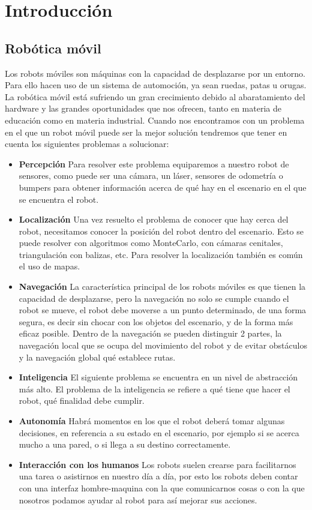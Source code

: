 \chapter{Introducción}
\label{cap:introduccion}

\section{Robótica móvil}
\label{cap:roboticamovil}
Los robots móviles son máquinas con la capacidad de desplazarse por un entorno. Para ello hacen uso de un sistema de automoción, ya sean ruedas, patas u orugas. 
La robótica móvil está sufriendo un gran crecimiento debido al abaratamiento del hardware y las grandes oportunidades que nos ofrecen, tanto en materia de educación como en materia industrial. 
Cuando nos encontramos con un problema en el que un robot móvil puede ser la mejor solución tendremos que tener en cuenta los siguientes problemas a solucionar:
\begin{itemize}
\item \textbf{Percepción} Para resolver este problema equiparemos a nuestro robot de sensores, como puede ser una cámara, un láser, sensores de odometría o bumpers para obtener información acerca de qué hay en el escenario en el que se encuentra el robot.
\item \textbf{Localización} Una vez resuelto el problema de conocer que hay cerca del robot, necesitamos conocer la posición del robot dentro del escenario. Esto se puede resolver con algoritmos como MonteCarlo, con cámaras cenitales, triangulación con balizas, etc. Para resolver la localización también es común el uso de mapas. 
\item \textbf{Navegación} La característica principal de los robots móviles es que tienen la capacidad de desplazarse, pero la navegación no solo se cumple cuando el robot se mueve, el robot debe moverse a un punto determinado, de una forma segura, es decir sin chocar con los objetos del escenario, y de la forma más eficaz posible. Dentro de la navegación se pueden distinguir 2 partes, la navegación local que se ocupa del movimiento del robot y de evitar obstáculos y la navegación global qué establece rutas.
\item \textbf{Inteligencia} El siguiente problema se encuentra en un nivel de abstracción más alto. El problema de la inteligencia se refiere a qué tiene que hacer el robot, qué finalidad debe cumplir.
\item \textbf{Autonomía} Habrá momentos en los que el robot deberá tomar algunas decisiones, en referencia a su estado en el escenario, por ejemplo si se acerca mucho a una pared, o si llega a su destino correctamente.
\item \textbf{Interacción con los humanos} Los robots suelen crearse para facilitarnos una tarea o asistirnos en nuestro día a día, por esto los robots deben contar con una interfaz hombre-maquina con la que comunicarnos cosas o con la que nosotros podamos ayudar al robot para así mejorar sus acciones.
\end{itemize}

